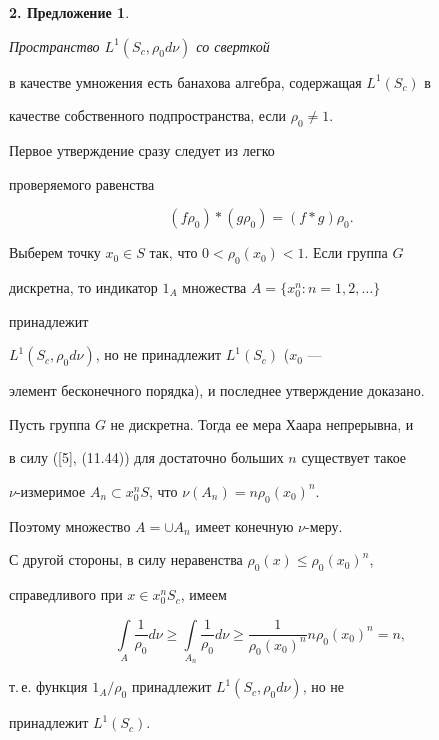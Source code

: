 {\bf 2. Предложение 1}. {\it Пространство $L^1(S_c,\rho_0d\nu)$ со сверткой


в качестве умножения есть банахова алгебра, содержащая $L^1(S_c)$ в


качестве собственного подпространства, если $\rho_0\ne 1$.}


\addtocounter{prop}{1}





\begin{pf} Первое утверждение сразу следует из легко


проверяемого равенства


\begin{equation}


(f\rho_0)\ast(g\rho_0)=(f\ast g)\rho_0.


\end{equation}





Выберем точку $x_0\in S$ так, что $0<\rho_0(x_0)<1$. Если группа $G$


дискретна, то индикатор $1_A$ множества $A=\{x^n_0:n=1,2,\dotsc\}$


принадлежит


$L^1(S_c,\rho_0 d\nu)$, но не принадлежит $L^1(S_c)$ ($x_0$ ---


элемент бесконечного порядка), и последнее утверждение доказано.





Пусть группа $G$ не дискретна. Тогда ее мера Хаара непрерывна, и


в силу ([5], (11.44)) для достаточно больших $n$ существует такое


$\nu$-измеримое $A_n\subset x_0^nS$, что $\nu(A_n)=n\rho_0(x_0)^n$.


Поэтому множество $A=\cup A_n$ имеет конечную $\nu$-меру.


С другой стороны, в силу неравенства $\rho_0(x)\leq\rho_0(x_0)^n$,


справедливого при $x\in x_0^nS_c$, имеем


$$


\int\limits_{A}\frac{1}{\rho_0}d\nu\geq


\int\limits_{A_n}\frac{1}{\rho_0}d\nu


\geq\frac{1}{\rho_0(x_0)^n}n\rho_0(x_0)^n=n,


$$


т.\,е. функция $1_A/\rho_0$ принадлежит $L^1(S_c,\rho_0d\nu)$, но не


принадлежит $L^1(S_c)$.


\end{pf}





